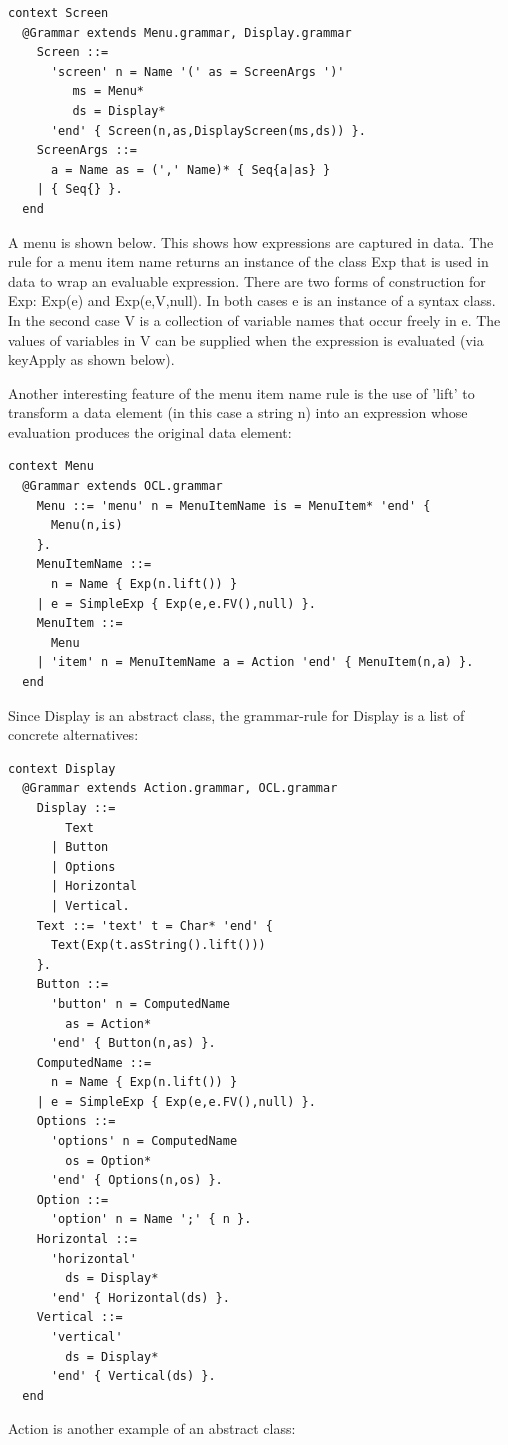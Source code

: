 \begin{lstlisting}
context Screen
  @Grammar extends Menu.grammar, Display.grammar
    Screen ::= 
      'screen' n = Name '(' as = ScreenArgs ')' 
         ms = Menu* 
         ds = Display* 
      'end' { Screen(n,as,DisplayScreen(ms,ds)) }.
    ScreenArgs ::=
      a = Name as = (',' Name)* { Seq{a|as} }
    | { Seq{} }.
  end
\end{lstlisting}A menu is shown below. This shows how expressions are captured in
data. The rule for a menu item name returns an instance of the class
Exp that is used in data to wrap an evaluable expression. There are
two forms of construction for Exp: Exp(e) and Exp(e,V,null). In both
cases e is an instance of a syntax class. In the second case V is
a collection of variable names that occur freely in e. The values
of variables in V can be supplied when the expression is evaluated
(via keyApply as shown below).

Another interesting feature of the menu item name rule is the use
of 'lift' to transform a data element (in this case a string n) into
an expression whose evaluation produces the original data element:

\begin{lstlisting}
context Menu
  @Grammar extends OCL.grammar
    Menu ::= 'menu' n = MenuItemName is = MenuItem* 'end' {
      Menu(n,is)
    }.
    MenuItemName ::= 
      n = Name { Exp(n.lift()) }
    | e = SimpleExp { Exp(e,e.FV(),null) }.
    MenuItem ::=
      Menu
    | 'item' n = MenuItemName a = Action 'end' { MenuItem(n,a) }.
  end
\end{lstlisting}Since Display is an abstract class, the grammar-rule for Display is
a list of concrete alternatives:

\begin{lstlisting}
context Display
  @Grammar extends Action.grammar, OCL.grammar
    Display ::=
        Text
      | Button
      | Options
      | Horizontal
      | Vertical.
    Text ::= 'text' t = Char* 'end' { 
      Text(Exp(t.asString().lift())) 
    }.
    Button ::= 
      'button' n = ComputedName 
        as = Action* 
      'end' { Button(n,as) }.
    ComputedName ::=
      n = Name { Exp(n.lift()) }
    | e = SimpleExp { Exp(e,e.FV(),null) }.
    Options ::= 
      'options' n = ComputedName 
        os = Option* 
      'end' { Options(n,os) }.
    Option ::=
      'option' n = Name ';' { n }.
    Horizontal ::=
      'horizontal'
        ds = Display*
      'end' { Horizontal(ds) }.
    Vertical ::=
      'vertical'
        ds = Display*
      'end' { Vertical(ds) }.
  end
\end{lstlisting}Action is another example of an abstract class:

